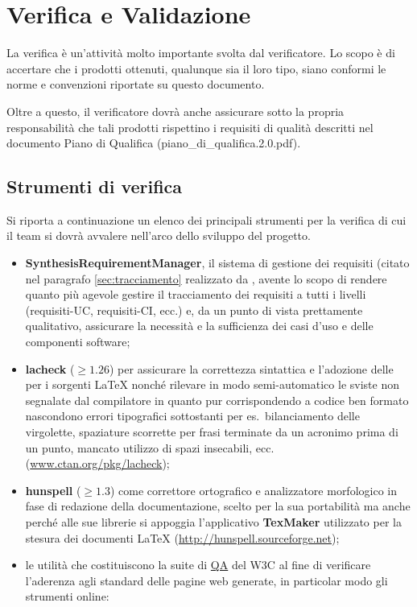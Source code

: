 {\clearpage
\section{Verifica e Validazione}
La verifica è un'attività molto importante svolta dal verificatore. Lo scopo è di accertare che i prodotti ottenuti, qualunque sia il loro tipo, siano conformi le norme e convenzioni riportate su questo documento.

Oltre a questo, il verificatore dovrà anche assicurare sotto la propria responsabilità che tali prodotti rispettino i requisiti di qualità descritti nel documento Piano di Qualifica (piano\_di\_qualifica.2.0.pdf).

\subsection{Strumenti di verifica}\label{sec:tools}
Si riporta a continuazione un elenco dei principali strumenti per la verifica di cui il team si dovrà avvalere nell'arco dello sviluppo del progetto.
\begin{itemize}
  \item \textbf{SynthesisRequirementManager}, il sistema di gestione dei requisiti (citato nel paragrafo \ref{sec:tracciamento} realizzato da \team, avente lo scopo di rendere quanto più agevole gestire il tracciamento dei requisiti a tutti i livelli (requisiti-UC, requisiti-CI, ecc.) e, da un punto di vista prettamente qualitativo, assicurare la necessità e la sufficienza dei casi d'uso e delle componenti software;
 \item \textbf{lacheck} ($\geq 1.26$) per assicurare la correttezza sintattica e l'adozione delle  per i sorgenti \LaTeX{} nonché rilevare in modo semi-automatico le sviste non segnalate dal compilatore in quanto pur corrispondendo a codice ben formato nascondono errori tipografici sottostanti per es.~bilanciamento delle virgolette, spaziature scorrette per frasi terminate da un acronimo prima di un punto, mancato utilizzo di spazi insecabili, ecc. (\url{www.ctan.org/pkg/lacheck});
 \item \textbf{hunspell} ($\geq 1.3$) come correttore ortografico e analizzatore morfologico in fase di redazione della documentazione, scelto per la sua portabilità ma anche perché alle sue librerie si appoggia l'applicativo \textbf{TexMaker} utilizzato per la stesura dei documenti \LaTeX{} (\url{http://hunspell.sourceforge.net});
 \item le utilità che costituiscono la suite di \underline{QA} del W3C al fine di verificare l'aderenza agli standard delle pagine web generate, in particolar modo gli strumenti online:

\end{itemize}}
